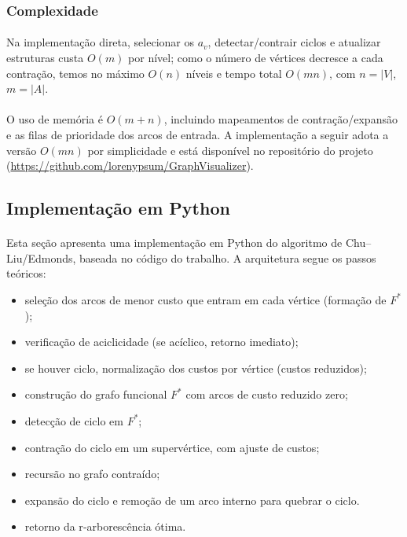 \documentclass[12pt,a4paper]{article}
\begin{document}
\subsubsection{Complexidade}
\paragraph{}
Na implementação direta, selecionar os \(a_v\), detectar/contrair ciclos e atualizar estruturas custa \(O(m)\) por nível; como o número de vértices decresce a cada contração, temos no máximo \(O(n)\) níveis e tempo total \(O(mn)\), com \(n=|V|\), \(m=|A|\).


\paragraph{}
O uso de memória é \(O(m+n)\), incluindo mapeamentos de contração/expansão e as filas de prioridade dos arcos de entrada. A implementação a seguir adota a versão \(O(mn)\) por simplicidade e está disponível no repositório do projeto (\url{https://github.com/lorenypsum/GraphVisualizer}).

\subsection{Implementação em Python}

\paragraph{}
Esta seção apresenta uma implementação em Python do algoritmo de Chu–Liu/Edmonds, baseada no código do trabalho. A arquitetura segue os passos teóricos:

\begin{itemize}\setlength{\itemsep}{2pt}
    \item seleção dos arcos de menor custo que entram em cada vértice (formação de \(F^*\));
    \item verificação de aciclicidade (se acíclico, retorno imediato);
    \item se houver ciclo, normalização dos custos por vértice (custos reduzidos);
    \item construção do grafo funcional \(F^*\) com arcos de custo reduzido zero;
    \item detecção de ciclo em \(F^*\);
    \item contração do ciclo em um supervértice, com ajuste de custos;
    \item recursão no grafo contraído;
    \item expansão do ciclo e remoção de um arco interno para quebrar o ciclo.
    \item retorno da r‑arborescência ótima.
\end{itemize}
\end{document}
